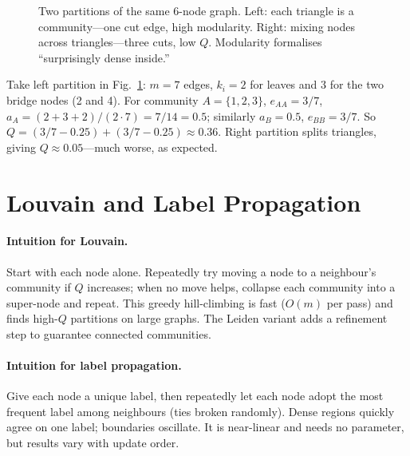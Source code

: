 \begin{figure}[h]
\caption{Two partitions of the same 6-node graph. Left: each triangle is a community---one cut edge, high modularity. Right: mixing nodes across triangles---three cuts, low $Q$. Modularity formalises ``surprisingly dense inside.''}
\label{fig:two-comms}
\end{figure}

\begin{example}\label{ex:mod-by-hand}
Take left partition in Fig.~\ref{fig:two-comms}: $m=7$ edges, $k_i=2$ for leaves and $3$ for the two bridge nodes (2 and 4). For community $A=\{1,2,3\}$, $e_{AA}=3/7$, $a_A=(2+3+2)/(2\cdot7)=7/14=0.5$; similarly $a_B=0.5$, $e_{BB}=3/7$. So $Q=(3/7-0.25)+(3/7-0.25)\approx0.36$. Right partition splits triangles, giving $Q\approx0.05$---much worse, as expected.
\end{example}

\section{Louvain and Label Propagation}
\label{sec:louvain}
\paragraph{Intuition for Louvain.} Start with each node alone. Repeatedly try moving a node to a neighbour's community if $Q$ increases; when no move helps, collapse each community into a super-node and repeat. This greedy hill-climbing is fast ($O(m)$ per pass) and finds high-$Q$ partitions on large graphs. The Leiden variant adds a refinement step to guarantee connected communities.

\paragraph{Intuition for label propagation.} Give each node a unique label, then repeatedly let each node adopt the most frequent label among neighbours (ties broken randomly). Dense regions quickly agree on one label; boundaries oscillate. It is near-linear and needs no parameter, but results vary with update order.

